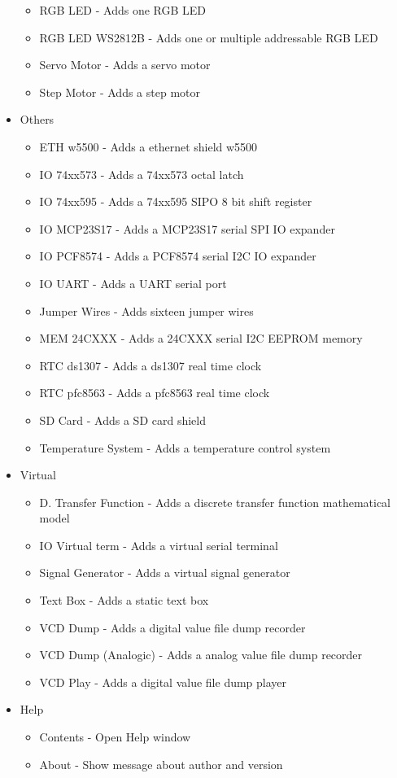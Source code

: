 \begin{itemize}
\begin{itemize}
   \item RGB LED - Adds one RGB LED 
   \item RGB LED WS2812B - Adds one or multiple addressable RGB LED 
   \item Servo Motor - Adds a servo motor
   \item Step Motor - Adds a step motor
 \end{itemize}
 \item{Others}
  \begin{itemize}
   \item ETH w5500 - Adds a ethernet shield w5500
   \item IO 74xx573 - Adds a 74xx573 octal latch
   \item IO 74xx595 - Adds a 74xx595 SIPO 8 bit shift register
   \item IO MCP23S17 - Adds a MCP23S17 serial SPI IO expander
   \item IO PCF8574 - Adds a PCF8574 serial I2C IO expander
   \item IO UART - Adds a UART serial port 
   \item Jumper Wires - Adds sixteen jumper wires 
   \item MEM 24CXXX - Adds a 24CXXX serial I2C EEPROM  memory
   \item RTC ds1307 - Adds a ds1307 real time clock 
   \item RTC pfc8563 - Adds a pfc8563 real time clock
   \item SD Card - Adds a SD card shield
   \item Temperature System - Adds a temperature control system
  \end{itemize}
\item{Virtual}
  \begin{itemize}
  \item D. Transfer Function - Adds a discrete transfer function mathematical model
  \item IO Virtual term - Adds a virtual serial terminal 
  \item Signal Generator - Adds a virtual signal generator
  \item Text Box - Adds a static text box
  \item VCD Dump - Adds a digital value file dump recorder 
  \item VCD Dump (Analogic) - Adds a analog value file dump recorder  
  \item VCD Play - Adds a digital value file dump player  
  \end{itemize}   
 \item Help
 \begin{itemize}
 \item Contents - Open Help window
 \item About - Show message about author and version
\end{itemize}
\end{itemize}


